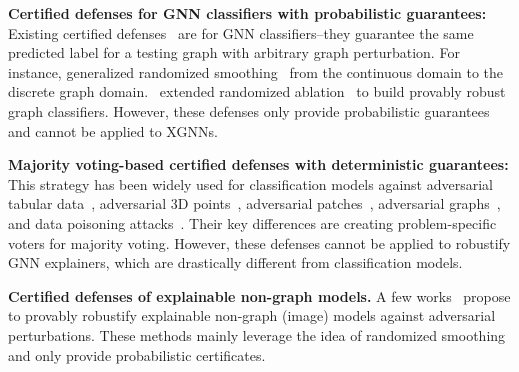 {\bf Certified defenses for GNN classifiers with probabilistic guarantees:} Existing certified defenses~\citep{bojchevski2020efficient,wang2021certified,zhang2021backdoor} are for GNN classifiers--they guarantee the same predicted label for a testing graph with arbitrary graph perturbation. 
For instance,
\citet{wang2021certified}  generalized randomized smoothing~\citep{lecuyer2019certified,cohen2019certified,hong2022unicr} from the continuous domain to the discrete graph domain.~\citet{zhang2021backdoor} extended randomized ablation~\citep{levine2020robustness} to build provably robust graph classifiers. 
However, these defenses only provide probabilistic guarantees and cannot be applied to XGNNs.

{\bf Majority voting-based certified defenses with deterministic guarantees:} 
This strategy has been widely used for classification models against adversarial tabular data~\citep{hammoudeh2023feature},
adversarial 3D points~\citep{zhang2023pointcert}, adversarial patches~\citep{levine2020randomized,xiang2021patchguard}, adversarial graphs~\citep{xia2024gnncert,yang2024distributed,li2025agnncert}, and {data poisoning attacks~\citep{levine2020deep,jia2021intrinsic,wang2022improved,jia2022certified}}. 
Their key differences are creating problem-specific voters for majority voting. 
 {However, these defenses  cannot be applied to 
robustify GNN explainers, which are drastically different from classification models.} 

{\bf Certified defenses of explainable non-graph models.} A few works~\citep{levine2019certifiably,liu2022certifiably,tan2023robust} propose to provably robustify explainable non-graph (image) models against adversarial perturbations. These methods mainly leverage the idea of randomized smoothing \citep{lecuyer2019certified,cohen2019certified} and only provide probabilistic certificates.
